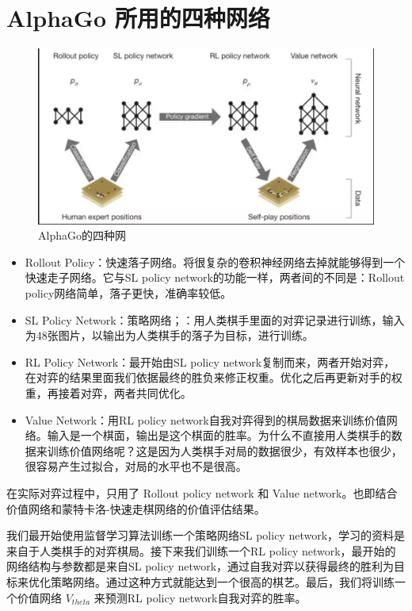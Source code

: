 \documentclass[12pt]{article}
\begin{document}
\section{AlphaGo 所用的四种网络}
\begin{figure}[ht]
  \centering
  \includegraphics[width=.8\textwidth]{fig/AlphaGo的四种网络.png} %
  \caption{AlphaGo的四种网} %
\end{figure}

\begin{itemize}[itemindent=2em]
    \item Rollout Policy：快速落子网络。将很复杂的卷积神经网络去掉就能够得到一个快速走子网络。它与SL policy network的功能一样，两者间的不同是：Rollout policy网络简单，落子更快，准确率较低。
    
    \item SL Policy Network：策略网络；：用人类棋手里面的对弈记录进行训练，输入为48张图片，以输出为人类棋手的落子为目标，进行训练。
    
    \item RL Policy Network：最开始由SL policy network复制而来，两者开始对弈，在对弈的结果里面我们依据最终的胜负来修正权重。优化之后再更新对手的权重，再接着对弈，两者共同优化。
    
    \item Value Network：用RL policy network自我对弈得到的棋局数据来训练价值网络。输入是一个棋面，输出是这个棋面的胜率。为什么不直接用人类棋手的数据来训练价值网络呢？这是因为人类棋手对局的数据很少，有效样本也很少，很容易产生过拟合，对局的水平也不是很高。
\end{itemize}

在实际对弈过程中，只用了 Rollout policy network 和 Value network。也即结合价值网络和蒙特卡洛-快速走棋网络的价值评估结果。

我们最开始使用监督学习算法训练一个策略网络SL policy network，学习的资料是来自于人类棋手的对弈棋局。接下来我们训练一个RL policy network，最开始的网络结构与参数都是来自SL policy network，通过自我对弈以获得最终的胜利为目标来优化策略网络。通过这种方式就能达到一个很高的棋艺。最后，我们将训练一个价值网络 $V_{theta}$ 来预测RL policy network自我对弈的胜率。
\end{document}
